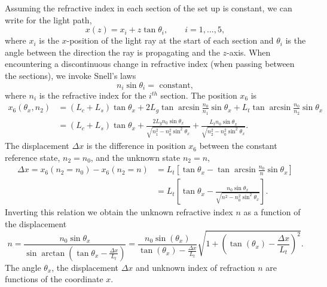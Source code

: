 \documentclass[smallextended]{svjour3}       %
\begin{document}
Assuming the refractive index in each section of the set up is constant, we can write for the light path,
\begin{equation}
	\label{eq:simpleline}
x(z) = x_i + z \tan \theta_i, \qquad i = 1, ... , 5,
\end{equation}
where $x_i$ is the $x$-position of the light ray at the start of each section and $\theta_i$ is the angle between the direction the ray is propagating and the $z$-axis. When encountering a discontinuous change in refractive index (when passing between the sections), we invoke Snell's laws
\begin{equation}
	\label{eq:snellslaw}
n_i \sin \theta_i = \mbox{ constant},
\end{equation}
where $n_i$ is the refractive index for the $i^{th}$ section. The position $x_6$ is
\begin{align}
\label{eq:simplex6}
x_6 (\theta_x, n_2) & =  (L_c+L_s) \tan \theta_x + 2 L_g \tan \arcsin \frac{n_0}{n_1} \sin \theta_x + L_t \tan \arcsin \frac{n_0}{n_2} \sin \theta_x \nonumber \\
& =  (L_c+L_s) \tan \theta_x + \frac{2 L_g n_0 \sin \theta_x}{\sqrt{n_1^2 - n_0^2 \sin^2 \theta_x}} + \frac{L_t n_0 \sin \theta_x}{\sqrt{n_2^2 - n_0^2 \sin^2 \theta_x}}.
\end{align}
The displacement $\Delta x$ is the difference in position $x_6$ between the constant reference state, $n_2 = n_0$, and the unknown state $n_2=n$, 
\begin{align}
\label{eq:dexcon2}
\Delta x = x_6 (n_2 = n_0) - x_6 (n_2 = n) & = L_t \left[ \tan \theta_x - \tan \arcsin \frac{n_0}{n} \sin \theta_x\right] \nonumber \\
& = L_t \left[ \tan \theta_x - \frac{n_0 \sin \theta_x}{\sqrt{n^2 - n_0^2 \sin^2 \theta_x}} \right] .
\end{align}
Inverting this relation we obtain the unknown refractive index $n$ as a function of the displacement
\begin{equation}
\label{eq:invdexcon2}
n = \frac{n_0 \sin \theta_x}{\sin \arctan \left( \tan \theta_x - \frac{\Delta x}{L_t} \right)} = \frac{n_0 \sin(\theta_x)}{\tan(\theta_x)-\frac{\Delta x}{L_t}} \sqrt{1+\left(\tan(\theta_x)-\frac{\Delta x}{L_t}\right)^2}.
\end{equation}
The angle $\theta_x$, the displacement $\Delta x$ and unknown index of refraction $n$ are functions of the coordinate $x$. %
\end{document}
